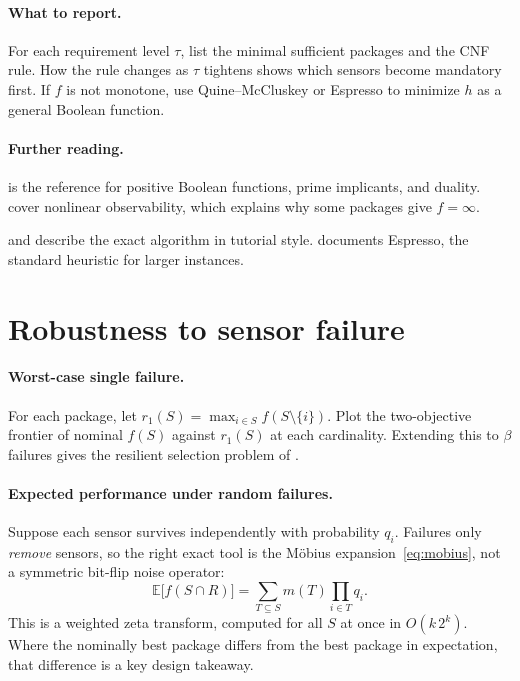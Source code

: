 \documentclass[11pt]{article}
\newcommand{\E}{\mathbb{E}}
\begin{document}
\paragraph{What to report.}
For each requirement level $\tau$, list the minimal sufficient packages and the CNF rule.
How the rule changes as $\tau$ tightens shows which sensors become mandatory first.
If $f$ is not monotone, use Quine--McCluskey \parencite{Quine1952,McCluskey1956} or Espresso \parencite{Brayton1984} to minimize $h$ as a general Boolean function.

\paragraph{Further reading.}
\begin{reading}
  \item[Mathematics.] \textcite{CramaHammer2011} is the reference for positive Boolean functions, prime implicants, and duality.
        \textcite{HermannKrener1977} cover nonlinear observability, which explains why some packages give $f=\infty$.
  \item[Applying it.] \textcite{Quine1952} and \textcite{McCluskey1956} describe the exact algorithm in tutorial style.
        \textcite{Brayton1984} documents Espresso, the standard heuristic for larger instances.
\end{reading}

\section{Robustness to sensor failure}\label{sec:robust}

\paragraph{Worst-case single failure.}
For each package, let $r_1(S)=\max_{i\in S}f(S\setminus\{i\})$.
Plot the two-objective frontier of nominal $f(S)$ against $r_1(S)$ at each cardinality.
Extending this to $\beta$ failures gives the resilient selection problem of \textcite{Tzoumas2017}.

\paragraph{Expected performance under random failures.}
Suppose each sensor survives independently with probability $q_i$.
Failures only \emph{remove} sensors, so the right exact tool is the M\"obius expansion~\eqref{eq:mobius}, not a symmetric bit-flip noise operator:
\begin{equation}
  \E\bigl[f(S\cap R)\bigr]=\sum_{T\subseteq S}m(T)\prod_{i\in T}q_i .
\end{equation}
This is a weighted zeta transform, computed for all $S$ at once in $O(k\,2^k)$.
Where the nominally best package differs from the best package in expectation, that difference is a key design takeaway.
\end{document}
